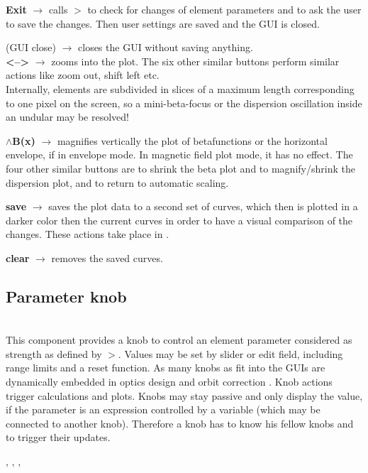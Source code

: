 \documentclass[12pt]{article}
\newcommand\code[1]{{\tt #1}}
\newcommand{\ofld}[1]{\colorbox{black!15}{{{\color{black}\bf #1}}}}
\newcommand{\ofldx}[1]{\colorbox{black!15}{{\color{black}(#1)}}}
\newcommand\guico[1]{{\color{blue}\code{#1}}}
\newcommand{\unico}[1]{{\color{burntorange}\code{#1}}}
\newcommand{\evcod}[2]{\ofld{#1} $\rightarrow$ \guico{#2}}
\newcommand{\evcodx}[2]{\ofldx{#1} $\rightarrow$ \guico{#2}}
\newcommand{\prcod}[2]{\opauni{#1}$>$\unico{#2}}
\newcommand{\opagui}[1]{\colorbox{blue!20}{{\color{black}\code{#1}}}}
\newcommand{\ogui}[1]{\hyperref[#1]{\opagui{#1}}}
\newcommand{\opaguif}[1]{\colorbox{violet!30}{{\color{black}\code{#1}}}}
\newcommand{\oguifh}[2]{\subsection{\label{#2}#1}{\Huge\opaguif{#2}}\\}
\newcommand{\opauni}[1]{\colorbox{orange!30}{{\color{black}\code{#1}}}}
\newcommand{\ouni}[1]{\hyperref[#1]{\opauni{#1}}}
\newcommand{\uses}[1]{\flushleft {\bf Uses:} #1}
\newcommand{\desc}[1]{#1}
\newcommand{\feature}[1]{{\color{cadmiumgreen} #1}}
\begin{document}
{\evcod{Exit}{butexitClick} calls \prcod{globlib}{EllaSave} to check for changes of element parameters and to ask the user to save the changes. Then user settings are saved and the GUI is closed.

\evcodx{GUI close}{FormClose} closes the GUI without saving anything.\\

\evcod{\textless--\textgreater}{buzoominClick} zooms into the plot. The six other similar buttons perform similar actions like zoom out, shift left etc.\\ \feature{Internally, elements are subdivided in slices of a maximum length corresponding to one pixel on the screen, so a mini-beta-focus or the dispersion oscillation inside an undular may be resolved!}

\evcod{$\wedge$B(x)}{buyupClick} magnifies vertically the plot of betafunctions or the horizontal envelope, if in envelope mode. In magnetic field plot mode, it has no effect. The four other similar buttons are to shrink the beta plot and to magnify/shrink  the dispersion plot, and to return to automatic scaling.

\evcod{save}{bucsaveClick} saves the plot data to a second set of curves, which then is plotted in a darker color then the current curves in order to have a visual comparison of the changes. These actions take place in \ouni{linoplib}.

\evcod{clear}{bucclearClick} removes the saved curves.

}




\oguifh{Parameter knob}{knobframe} 

\desc{This component provides a knob to control an element parameter considered as strength as defined by \prcod{OPAgloal}{putkval/getkval}. Values may be set by slider or edit field, including range limits and a reset function. As many knobs as fit into the GUIs are dynamically embedded in optics design \ogui{opalinop} and orbit correction \ogui{opaorbit}. Knob actions trigger calculations and plots. Knobs may stay passive and only display the value, if the parameter is an expression controlled by a variable (which may be connected to another knob). Therefore a knob has to know his fellow knobs and to trigger their updates.}

\uses{\ouni{linoplib}, \ouni{globlib}, \ouni{mathlib}, \ouni{../com/asaux}} 
 
\end{document}
